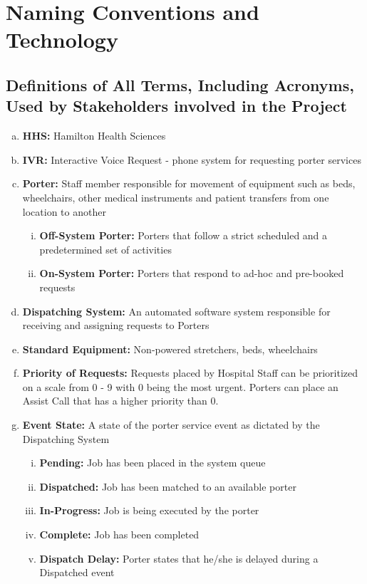 \documentclass[paper=letter, fontsize=10pt]{scrartcl}
\numberwithin{equation}{section}		%
\numberwithin{figure}{section}			%
\numberwithin{table}{section}				%
\begin{document}
\section{Naming Conventions and Technology}
\subsection{Definitions of All Terms, Including Acronyms, Used by Stakeholders involved in the Project}
\begin{enumerate}[(a)]
	\item \textbf{HHS:} Hamilton Health Sciences
	\item \textbf{IVR:} Interactive Voice Request - phone system for requesting porter services
	\item \textbf{Porter:} Staff member responsible for movement of equipment such as beds, wheelchairs, other medical instruments and patient transfers from one location to another
	\begin{enumerate}[(i)]
		\item \textbf{Off-System Porter:} Porters that follow a strict scheduled and a predetermined set of activities
		\item \textbf{On-System Porter:} Porters that respond to ad-hoc and pre-booked requests	
	\end{enumerate}
	\item \textbf{Dispatching System:} An automated software system responsible for receiving and assigning requests to Porters
	\item \textbf{Standard Equipment:} Non-powered stretchers, beds, wheelchairs
	\item \textbf{Priority of Requests:} Requests placed by Hospital Staff can be prioritized on a scale from 0 - 9 with 0 being the most urgent. Porters can place an Assist Call that has a higher priority than 0.
	\item \textbf{Event State:} A state of the porter service event as dictated by the Dispatching System
	\begin{enumerate}[(i)]
		\item \textbf{Pending:} Job has been placed in the system queue
		\item \textbf{Dispatched:} Job has been matched to an available porter
		\item \textbf{In-Progress:} Job is being executed by the porter
		\item \textbf{Complete:} Job has been completed
		\item \textbf{Dispatch Delay:} Porter states that he/she is delayed during a Dispatched event

\end{enumerate}
\end{enumerate}
\end{document}
